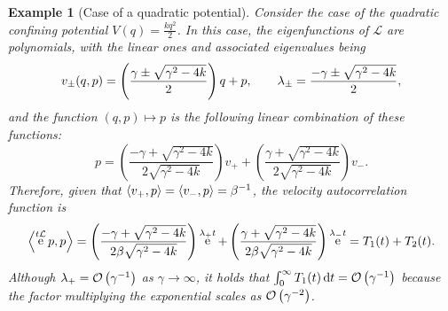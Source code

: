 \documentclass[11pt,a4paper]{article}
\DeclareMathOperator{\e}{e}
\renewcommand{\d}{\mathrm d}
\theoremstyle{plain}
\newtheorem{example}{Example}[section]
\numberwithin{equation}{section}
\begin{document}
\begin{example}
    [Case of a quadratic potential]
    Consider the case of the quadratic confining potential $V(q) = \frac{k q^2}{2}$.
    In this case, the eigenfunctions of $\mathcal L$ are polynomials,
    with the linear ones and associated eigenvalues being
    \[
        v_{\pm}(q, p) =
        \left( \frac{\gamma \pm \sqrt{\gamma^2 - 4k}}{2} \right) q + p, \\
        \qquad
        \lambda_{\pm} = \frac{- \gamma \pm \sqrt{\gamma^2 - 4k}}{2},
    \]
    and the function $(q, p) \mapsto p$ is the following linear combination of these functions:
    \[
        p =
        \left( \frac{-\gamma + \sqrt{\gamma^2 - 4k}}{2 \sqrt{\gamma^2 - 4k}} \right) v_+
        + \left( \frac{\gamma + \sqrt{\gamma^2 - 4k}}{2 \sqrt{\gamma^2 - 4k}} \right) v_-.
    \]
    Therefore, given that $\ip{v_+}{p} = \ip{v_-}{p} = \beta^{-1}$,
    the velocity autocorrelation function is
    \[
        \ip{\e^{t \mathcal L}p}{p} =
        \left( \frac{-\gamma + \sqrt{\gamma^2 - 4k}}{2 \beta \sqrt{\gamma^2 - 4k}} \right) \e^{\lambda_+ t} +
        \left( \frac{\gamma + \sqrt{\gamma^2 - 4k}}{2 \beta \sqrt{\gamma^2 - 4k}} \right) \e^{\lambda_- t} = T_1(t) + T_2(t).
    \]
    Although $\lambda_+ = \bigo {\gamma^{-1}}$ as $\gamma \to \infty$,
    it holds that $\int_{0}^{\infty} T_1(t) \, \d t = \bigo{\gamma^{-1}}$
    because the factor multiplying the exponential scales as $\bigo {\gamma^{-2}}$.
\end{example}
\end{document}
